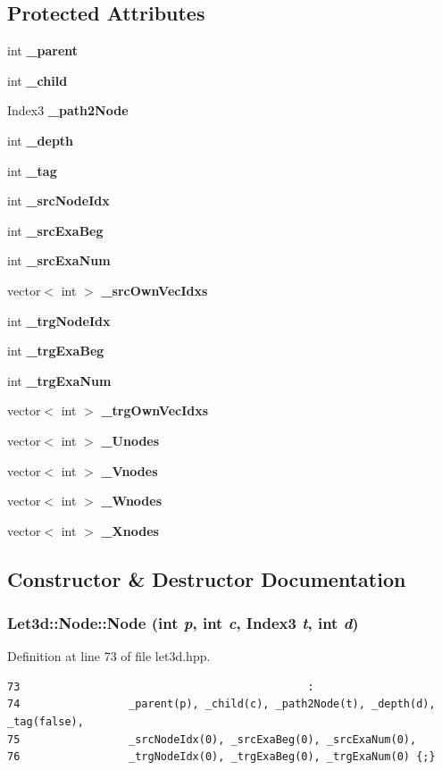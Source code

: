 \subsection*{Protected Attributes}
\begin{CompactItemize}
\item 
int {\bf \_\-parent}
\item 
int {\bf \_\-child}
\item 
Index3 {\bf \_\-path2Node}
\item 
int {\bf \_\-depth}
\item 
int {\bf \_\-tag}
\item 
int {\bf \_\-src\-Node\-Idx}
\item 
int {\bf \_\-src\-Exa\-Beg}
\item 
int {\bf \_\-src\-Exa\-Num}
\item 
vector$<$ int $>$ {\bf \_\-src\-Own\-Vec\-Idxs}
\item 
int {\bf \_\-trg\-Node\-Idx}
\item 
int {\bf \_\-trg\-Exa\-Beg}
\item 
int {\bf \_\-trg\-Exa\-Num}
\item 
vector$<$ int $>$ {\bf \_\-trg\-Own\-Vec\-Idxs}
\item 
vector$<$ int $>$ {\bf \_\-Unodes}
\item 
vector$<$ int $>$ {\bf \_\-Vnodes}
\item 
vector$<$ int $>$ {\bf \_\-Wnodes}
\item 
vector$<$ int $>$ {\bf \_\-Xnodes}
\end{CompactItemize}


\subsection{Constructor \& Destructor Documentation}
\subsubsection{\setlength{\rightskip}{0pt plus 5cm}Let3d::Node::Node (int {\em p}, int {\em c}, Index3 {\em t}, int {\em d})\hspace{0.3cm}{\tt  [inline]}}\label{classLet3d_1_1Node_fc1a9b4d57492964c65833ea79c507d5_fc1a9b4d57492964c65833ea79c507d5}




Definition at line 73 of file let3d.hpp.

\footnotesize\begin{verbatim}73                                             :
74                 _parent(p), _child(c), _path2Node(t), _depth(d), _tag(false),
75                 _srcNodeIdx(0), _srcExaBeg(0), _srcExaNum(0),
76                 _trgNodeIdx(0), _trgExaBeg(0), _trgExaNum(0) {;}

\end{verbatim}\normalsize 




